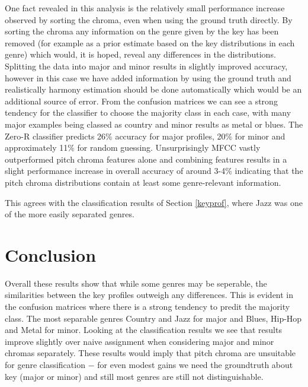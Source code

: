 \documentclass{article}
\begin{document}
One fact revealed in this analysis is the relatively small performance increase observed by sorting the chroma, even when using the ground truth directly. By sorting the chroma any information on the genre given by the key has been removed (for example as a prior estimate based on the key distributions in each genre) which would, it is hoped, reveal any differences in the distributions. Splitting the data into major and minor results in slightly improved accuracy, however in this case we have added information by using the ground truth and realistically harmony estimation should be done automatically which would be an additional source of error. From the confusion matrices we can see a strong tendency for the classifier to choose the majority class in each case, with many major examples being classed as country and minor results as metal or blues. The Zero-R classifier predicts 26\% accuracy for major profiles, 20\% for minor and approximately 11\% for random guessing. Unsurprisingly MFCC vastly outperformed pitch chroma features alone and combining features results in a slight performance increase in overall accuracy of around 3-4\% indicating that the pitch chroma distributions contain at least some genre-relevant information. 
    
This agrees with the classification results of Section \ref{keyprof}, where Jazz was one of the more easily separated genres.

   
\section{Conclusion}
Overall these results show that while some genres may be seperable, the similarities between the key profiles outweigh any differences. This is evident in the confusion matrices where there is a strong tendency to predit the majority class. The most separable genres Country and Jazz for major and Blues, Hip-Hop and Metal for minor. Looking at the classification results we see that results improve slightly over naive assignment when considering major and minor chromas separately. These results would imply that pitch chroma are unsuitable for genre classification $-$ for even modest gains we need the groundtruth about key (major or minor) and still most genres are still not distinguishable.




\end{document}
